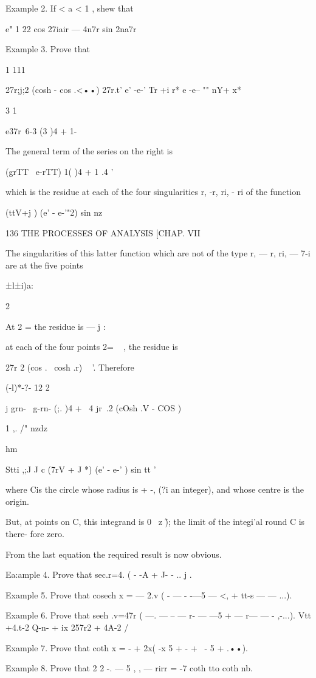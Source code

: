 Example 2. If < a < 1 , shew that

e" 1 22 cos 27iair — 4n7r sin 2na7r

Example 3. Prove that

1 111

27r;j;2 (cosh - cos .<••) 27r.t' e' -e-' Tr +i r* e -e-- "" nY+ x*

3 1

e37r\ 6-3 (3 )4 + 1-

The general term of the series on the right is

(grTT \ e-rTT) 1( )4 + 1 .4 '

which is the residue at each of the four singularities r, -r, ri, - ri
of the function

(ttV+j ) (e' - e-'"2) sin nz

136 THE PROCESSES OF ANALYSIS [CHAP. VII

The singularities of this latter function which are not of the type r,
— r, ri, — 7-i are at the five points

 ±l±i)a:

2

At 2 = the residue is — j :

at each of the four points 2= ~ , the residue is

 27r 2 (cos . \ cosh .r) ~ '. Therefore

  (-l)*-?- 12 2

 j grn- \ g-rn- (;. )4 + \ 4 jr\ .2 (cOsh .V - COS )

1 ,. /" nzdz

hm

Stti ,;J J c (7rV + J *) (e' - e-' ) sin tt '

where Cis the circle whose radius is + -, (?i an integer), and whose
centre is the origin.

But, at points on C, this integrand is 0 \ z \~ ); the limit of the
integi'al round C is there- fore zero.

From the last equation the required result is now obvious.

Ea:ample 4. Prove that sec.r=4. ( - -A + J- - .. j .

Example 5. Prove that cosech x = — 2.v ( - — - -—5 — <, + tt-s — —
...).

Example 6. Prove that seeh .v=47r ( —. — -- — r- — —5 + — r— — -
,-...). Vtt +4.t-2 Q-n- + ix 257r2 + 4A-2 /

Example 7. Prove that coth x = - + 2x( -x 5 + - + \ - 5 + .••).

Example 8. Prove that 2 2 -. — 5 , , — rirr = -7 coth tto coth nb.


